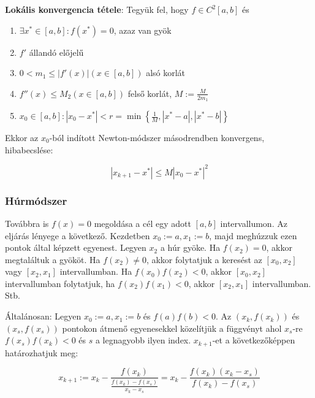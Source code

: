 \documentclass[margin=0px]{article}
\begin{document}
	\noindent \textbf{Lokális konvergencia tétele}:	Tegyük fel, hogy $f \in C^{2}[a,b]$ és
	\begin{enumerate}
		\item	$\exists x^{*} \in [a,b] : f(x^{*}) = 0$, azaz van gyök
		
		\item	$f'$ állandó előjelű
		
		\item	$0<m_{1} \leq |f'(x)| (x \in [a,b])$ alsó korlát
		
		\item	$f''(x) \leq M_{2} (x \in [a,b])$ felső korlát, $M:= \frac{M}{2m_{1}}$
		
		\item	$x_{0} \in [a,b]: |x_{0} - x^{*}| < r = \min \left\{\frac{1}{M}, |x^{*}-a|, |x^{*}-b|\right\}$
	\end{enumerate}
	
	\noindent Ekkor az $x_{0}$-ból indított Newton-módszer másodrendben konvergens, hibabecslése:
	
	\begin{displaymath}
		|x_{k+1} - x^{*}| \leq M|x_{0} - x^{*}|^{2}
	\end{displaymath}
	\subsubsection{Húrmódszer}
	
	Továbbra is $f(x) = 0$ megoldása a cél egy adott $[a, b]$ intervallumon. 
	Az eljárás lényege a következő. Kezdetben $x_{0} := a, x_{1} := b$, majd meghúzzuk ezen pontok által
	képzett egyenest. Legyen $x_{2}$ a húr gyöke. Ha $f(x_{2}) = 0$, akkor megtaláltuk a gyököt. Ha $f(x_{2}) \not = 0$,
	akkor folytatjuk a keresést az $[x_{0},x_{2}]$ vagy $[x_{2},x_{1}]$ intervallumban. Ha $f(x_{0})f(x_{2}) < 0$, akkor
	$[x_{0},x_{2}]$ intervallumban folytatjuk, ha $f(x_{2}) f(x_{1}) < 0$, akkor $[x_{2}, x_{1}]$ intervallumban. Stb.
	
	Általánosan: Legyen $x_{0} := a, x_{1} := b$ és	$f(a)f(b) < 0$. Az $(x_{k},f(x_{k}))$ és $(x_{s},f(x_{s}))$
	pontokon átmenő egyenesekkel közelítjük a függvényt	ahol $x_{s}$-re $f(x_{s})f(x_{k})<0$ és $s$ a legnagyobb ilyen index.
	$x_{k+1}$-et a következőképpen határozhatjuk meg:
	
	\begin{displaymath}
		x_{k+1} := x_{k} -
		\frac
		{f(x_{k})}
		{\frac{f(x_{k}) - f(x_{s})}{x_{k}-x_{s}}} =
		x_{k} -
		\frac
		{f(x_{k}) (x_{k} -x_{s}) }
		{f(x_{k}) - f(x_{s})}		
	\end{displaymath}
		
\end{document}
